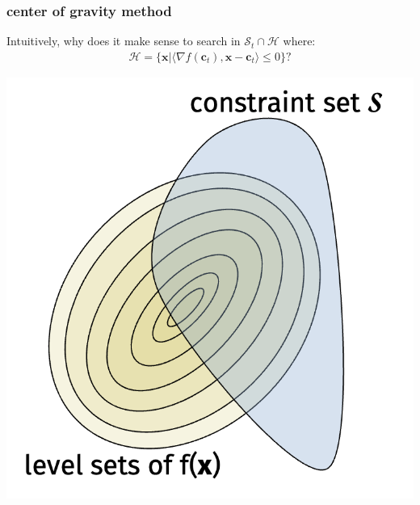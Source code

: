 \documentclass[compress]{beamer}
\newcommand{\bv}[1]{\mathbf{#1}}
\begin{document}
\begin{frame}[t]
	\frametitle{center of gravity method}
	Intuitively, why does it make sense to search in $\mathcal{S}_t \cap \mathcal{H}$ where:
	\begin{align*}
		\mathcal{H} = \{\bv{x} \big\vert \langle \nabla f(\bv{c}_t), \bv{x}-\bv{c}_t\rangle \leq 0\}?
	\end{align*}
	\begin{center}
		\includegraphics[width=.55\textwidth]{level_sets_constrained.png}
	\end{center}

\end{frame}
\end{document}
